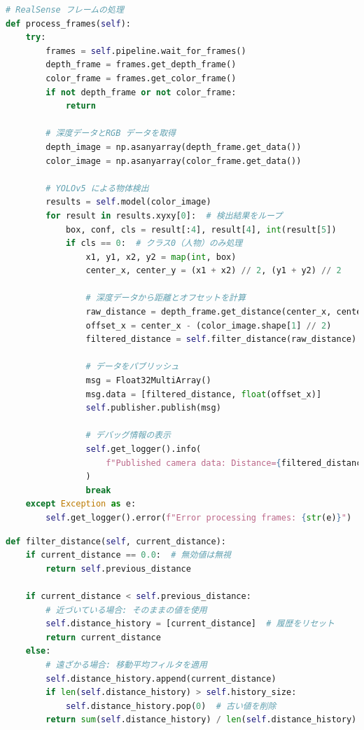 \newpage
\begin{lstlisting}[language=Python, caption=ターゲット検出と距離推定 (RealSense\_node.py)]
# RealSense フレームの処理
def process_frames(self):
    try:
        frames = self.pipeline.wait_for_frames()
        depth_frame = frames.get_depth_frame()
        color_frame = frames.get_color_frame()
        if not depth_frame or not color_frame:
            return

        # 深度データとRGB データを取得
        depth_image = np.asanyarray(depth_frame.get_data())
        color_image = np.asanyarray(color_frame.get_data())

        # YOLOv5 による物体検出
        results = self.model(color_image)
        for result in results.xyxy[0]:  # 検出結果をループ
            box, conf, cls = result[:4], result[4], int(result[5])
            if cls == 0:  # クラス0（人物）のみ処理
                x1, y1, x2, y2 = map(int, box)
                center_x, center_y = (x1 + x2) // 2, (y1 + y2) // 2

                # 深度データから距離とオフセットを計算
                raw_distance = depth_frame.get_distance(center_x, center_y)
                offset_x = center_x - (color_image.shape[1] // 2)
                filtered_distance = self.filter_distance(raw_distance)

                # データをパブリッシュ
                msg = Float32MultiArray()
                msg.data = [filtered_distance, float(offset_x)]
                self.publisher.publish(msg)

                # デバッグ情報の表示
                self.get_logger().info(
                    f"Published camera data: Distance={filtered_distance:.2f}, Offset={offset_x}"
                )
                break
    except Exception as e:
        self.get_logger().error(f"Error processing frames: {str(e)}")
\end{lstlisting}

\begin{lstlisting}[language=Python, caption=距離データのフィルタリング (RealSense\_node.py)]
def filter_distance(self, current_distance):
    if current_distance == 0.0:  # 無効値は無視
        return self.previous_distance

    if current_distance < self.previous_distance:
        # 近づいている場合: そのままの値を使用
        self.distance_history = [current_distance]  # 履歴をリセット
        return current_distance
    else:
        # 遠ざかる場合: 移動平均フィルタを適用
        self.distance_history.append(current_distance)
        if len(self.distance_history) > self.history_size:
            self.distance_history.pop(0)  # 古い値を削除
        return sum(self.distance_history) / len(self.distance_history)
\end{lstlisting}

